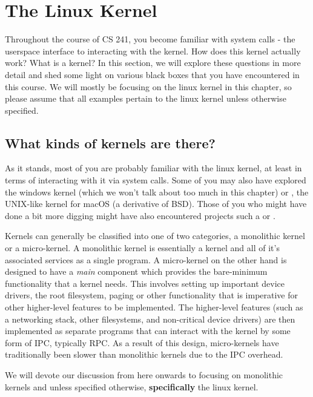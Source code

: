 \section{The Linux Kernel}

Throughout the course of CS 241, you become familiar with system calls - the userspace interface to interacting with the
kernel. How does this kernel actually work? What is a kernel? In this section, we will explore these questions in more
detail and shed some light on various black boxes that you have encountered in this course. We will mostly be focusing
on the linux kernel in this chapter, so please assume that all examples pertain to the linux kernel unless otherwise
specified.


\subsection{What kinds of kernels are there?}

As it stands, most of you are probably familiar with the linux kernel, at least in terms of interacting with it via
system calls. Some of you may also have explored the windows kernel (which we won't talk about too much in this chapter)
or , the UNIX-like kernel for macOS (a derivative of BSD). Those of you who might have done a bit more
digging might have also encountered projects such a  or .

Kernels can generally be classified into one of two categories, a monolithic kernel or a micro-kernel. A monolithic
kernel is essentially a kernel and all of it's associated services as a single program. A micro-kernel on the other hand
is designed to have a \textit{main} component which provides the bare-minimum functionality that a kernel needs. This
involves setting up important device drivers, the root filesystem, paging or other functionality that is imperative for
other higher-level features to be implemented. The higher-level features (such as a networking stack, other filesystems,
and non-critical device drivers) are then implemented as separate programs that can interact with the kernel by some
form of IPC, typically RPC. As a result of this design, micro-kernels have traditionally been slower than monolithic
kernels due to the IPC overhead.

We will devote our discussion from here onwards to focusing on monolithic kernels and unless specified otherwise,
\textbf{specifically} the linux kernel.

